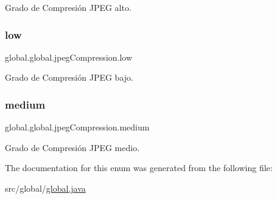 Grado de Compresión J\+P\+EG alto. 

\mbox{\label{enumglobal_1_1global_1_1jpegCompression_a4e03840e4d33824d24f3245053250850}} 
\subsubsection{\texorpdfstring{low}{low}}
{\footnotesize\ttfamily global.\+global.\+jpeg\+Compression.\+low}



Grado de Compresión J\+P\+EG bajo. 

\mbox{\label{enumglobal_1_1global_1_1jpegCompression_ac86c77dbe46a259b0a4cd45ea7c5e7dd}} 
\subsubsection{\texorpdfstring{medium}{medium}}
{\footnotesize\ttfamily global.\+global.\+jpeg\+Compression.\+medium}



Grado de Compresión J\+P\+EG medio. 



The documentation for this enum was generated from the following file\+:\begin{DoxyCompactItemize}
\item 
src/global/\hyperlink{global_8java}{global.\+java}\end{DoxyCompactItemize}
